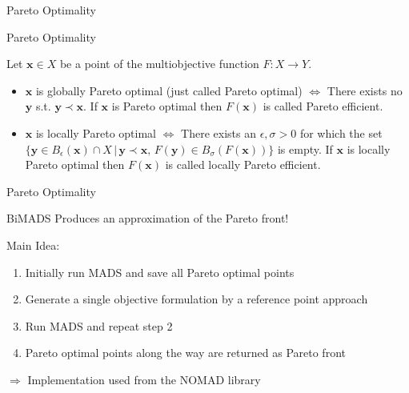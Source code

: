 \documentclass[aspectratio=43,t]{beamer}
\renewcommand{\vec}[1]{\mathbf{#1}}
\begin{document}
	\begin{frame}[fragile]{Pareto Optimality}
	\begin{figure}
        \centering
    \end{figure}
	\end{frame}

	\begin{frame}[fragile]{Pareto Optimality}
	\begin{definition}
        \label{def:optimality_multi}
        Let $\vec{x} \in X$ be a point of the multiobjective function $F: X \rightarrow Y$.
        \begin{itemize}
            \item $\vec{x}$ is globally Pareto optimal (just called Pareto optimal) 
            $\Longleftrightarrow$
            There exists no $\vec{y}$ s.t. $\vec{y} \prec \vec{x}$.
            If $\vec{x}$ is Pareto optimal then $F(\vec{x})$ is called
            Pareto efficient.

            \item $\vec{x}$ is locally Pareto optimal $\Longleftrightarrow$
            There exists an $\epsilon, \sigma > 0$ for which the set
            $\{\vec{y} \in B_{\epsilon}(\vec{x}) \cap X \, | \, \vec{y} \prec \vec{x},\, 
            F(\vec{y}) \in B_{\sigma}(F(\vec{x})) \}$ is empty.
            If $\vec{x}$ is locally Pareto optimal then $F(\vec{x})$ is called
            locally Pareto efficient.
        \end{itemize}
    \end{definition}
	\end{frame}

	\begin{frame}[fragile]{Pareto Optimality}
	\begin{figure}
        \centering
    \end{figure}
	\end{frame}

	\begin{frame}[fragile]{BiMADS}
		Produces an approximation of the Pareto front!\\
		\begin{block}{Main Idea:}
      	\begin{enumerate}
			\item<2-> Initially run MADS and save all Pareto optimal points
        	\item<3-> Generate a single objective formulation by a reference point approach
        	\item<4-> Run MADS and repeat step 2
        	\item<5-> Pareto optimal points along the way are returned as Pareto front
      	\end{enumerate}
		\end{block}
		\bigskip
		\bigskip
		$\Rightarrow$ Implementation used from the NOMAD library\\
	\end{frame}
\end{document}
